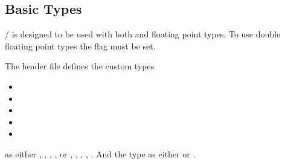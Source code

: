 %
%
%
%

\subsection{Basic Types}

\ANLOpenCL/ is designed to be used with both  and 
floating point types. To use double floating point types the 
flag  must be set.

The header file  defines the custom types 

\begin{itemize}
\item {}
\item {}
\item {}
\item {}
\item {}
\end{itemize}

as either , , , , 
 or , , , , 
. And the  type as either 
or .

